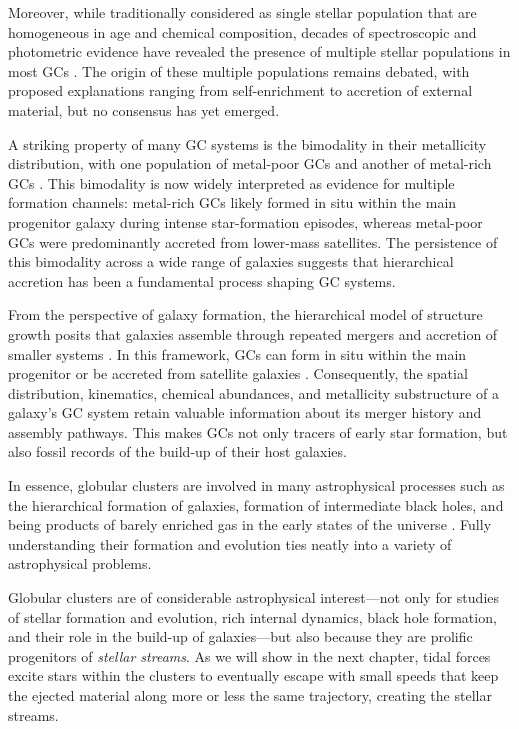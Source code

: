     Moreover, while traditionally considered as single stellar population that are homogeneous in age and chemical composition, decades of spectroscopic and photometric evidence have revealed the presence of multiple stellar populations in most GCs \citep{2008MNRAS.391..825D,2011ApJ...726...36C,2012A&ARv..20...50G,2018ARA&A..56...83B}. The origin of these multiple populations remains debated, with proposed explanations ranging from self-enrichment to accretion of external material, but no consensus has yet emerged.    
    
    A striking property of many GC systems is the bimodality in their metallicity distribution, with one population of metal-poor GCs and another of metal-rich GCs \citep[e.g.,][]{2006ARA&A..44..193B, 2015ApJ...806...36H}. This bimodality is now widely interpreted as evidence for multiple formation channels: metal-rich GCs likely formed in situ within the main progenitor galaxy during intense star-formation episodes, whereas metal-poor GCs were predominantly accreted from lower-mass satellites. The persistence of this bimodality across a wide range of galaxies suggests that hierarchical accretion has been a fundamental process shaping GC systems.

    From the perspective of galaxy formation, the hierarchical model of structure growth posits that galaxies assemble through repeated mergers and accretion of smaller systems \citep{2015ARA&A..53...51S}. In this framework, GCs can form in situ within the main progenitor or be accreted from satellite galaxies \citep[e.g.,][]{2018MNRAS.479.4760F,2020MNRAS.498.2472K,2021ApJ...920...51M,2022ApJ...930L...9M,2023A&A...673A..86P,2024MNRAS.528.3198B,2025A&A...693A.155P}. Consequently, the spatial distribution, kinematics, chemical abundances, and metallicity substructure of a galaxy's GC system retain valuable information about its merger history and assembly pathways. This makes GCs not only tracers of early star formation, but also fossil records of the build-up of their host galaxies.

    In essence, globular clusters are involved in many astrophysical processes such as the hierarchical formation of galaxies, formation of intermediate black holes, and being products of barely enriched gas in the early states of the universe \citep{2016ApJ...823...52K,2025arXiv250116438K}. Fully understanding their formation and evolution ties neatly into a variety of astrophysical problems.

    Globular clusters are of considerable astrophysical interest—not only for studies of stellar formation and evolution, rich internal dynamics, black hole formation, and their role in the build-up of galaxies—but also because they are prolific progenitors of \textit{stellar streams}. As we will show in the next chapter, tidal forces excite stars within the clusters to eventually escape with small speeds that keep the ejected material along more or less the same trajectory, creating the stellar streams.

